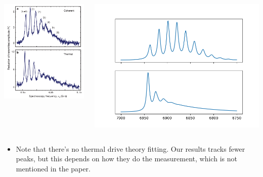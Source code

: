 \documentclass[xcolor=dvipsnames,hyperref={CJKbookmarks=true}]{beamer}
\begin{document}
\begin{frame}[t]
\begin{columns}
\begin{column}{0.4\linewidth}
    \centering
    \includegraphics[width=\linewidth]{thermal_origin.png}
\end{column}%
\begin{column}{0.6\linewidth}
	\centering
    \includegraphics[width=\linewidth]{thermal.png}
\end{column}
\end{columns}
\begin{itemize}
	\item Note that there's no thermal drive theory fitting. 
	Our results tracks fewer peaks, but this depends on 
	how they do the measurement, which is not mentioned in the paper. 
\end{itemize}
\end{frame}
\end{document}
